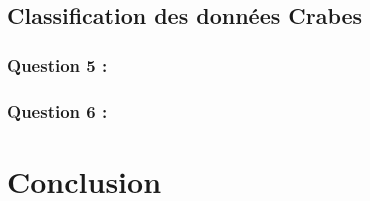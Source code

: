 \documentclass[a4paper, 10pt]{article}
\begin{document}
\subsection*{Classification des données Crabes}

\subsubsection*{Question 5 :}

\subsubsection*{Question 6 :}

\section*{Conclusion}
\end{document}
